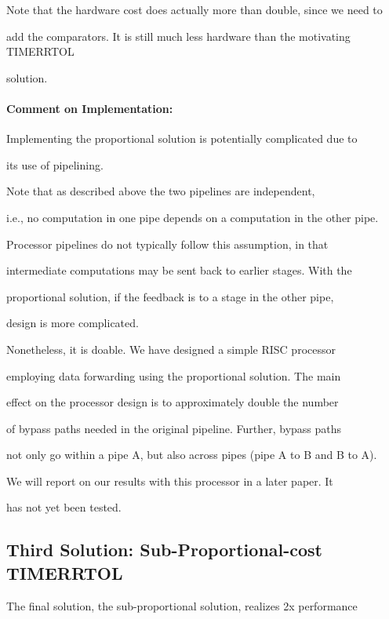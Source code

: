 \documentclass[12pt,dvips]{article}
\begin{document}
Note that the hardware cost does actually more than double, since we need to

add the comparators. It is still much less hardware than the motivating TIMERRTOL

solution.



\paragraph{Comment on Implementation: }

Implementing the proportional solution is potentially complicated due to

its use of pipelining. 

Note that as described above the two pipelines are independent,

i.e., no computation in one pipe depends on a computation in the other pipe.

Processor pipelines do not typically follow this assumption, in that

intermediate computations may be sent back to earlier stages. With the

proportional solution, if the feedback is to a stage in the other pipe,

design is more complicated.



Nonetheless, it is doable. We have designed a simple RISC processor

employing data forwarding using the proportional solution. The main

effect on the processor design is to approximately double the number

of bypass paths needed in the original pipeline. Further, bypass paths

not only go within a pipe A, but also across pipes (pipe A to B and B to A).

We will report on our results with this processor in a later paper. It

has not yet been tested.



\subsection{Third Solution: Sub-Proportional-cost TIMERRTOL}

\label{sub-prop-sol}

The final solution, the sub-proportional solution, realizes 2x performance
\end{document}
